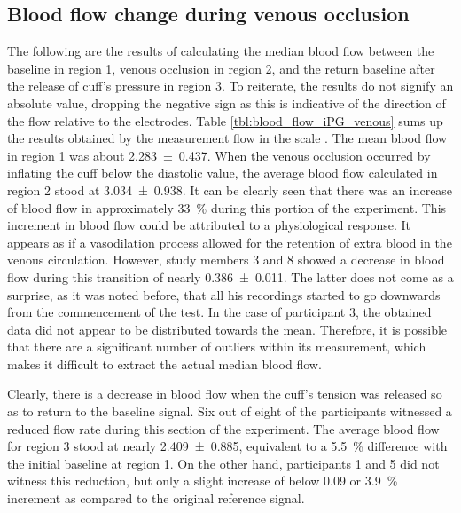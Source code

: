 \subsection{Blood flow change during venous occlusion}
\label{sectio results 3.1}
The following are the results of calculating the median blood flow between the baseline in region 1, venous occlusion in region 2, and the return baseline after the release of cuff's pressure in region 3. To reiterate, the results do not signify an absolute value, dropping the negative sign as this is indicative of the direction of the flow relative to the electrodes. Table \ref{tbl:blood_flow_iPG_venous} sums up the results obtained by the measurement flow in the scale \si{\bfv}. The mean blood flow in region 1 was about \SI{2.283(0437)}{\bfv}. When the venous occlusion occurred by inflating the cuff below the diastolic value, the average blood flow calculated in region 2 stood at \SI{3.034(0938)}{\bfv}. It can be clearly seen that there was an increase of blood flow in approximately \SI{33}{\percent} during this portion of the experiment. This increment in blood flow could be attributed to a physiological response. It appears as if a vasodilation process allowed for the retention of extra blood in the venous circulation. However, study members 3 and 8 showed a decrease in blood flow during this transition of nearly \SI{0.386(0011)}{\bfv}. The latter does not come as a surprise, as it was noted before, that all his recordings started to go downwards from the commencement of the test. In the case of participant 3, the obtained data did not appear to be distributed towards the mean. Therefore, it is possible that there are a significant number of outliers within its measurement, which makes it difficult to extract the actual median blood flow. 

Clearly, there is a decrease in blood flow when the cuff's tension was released so as to return to the baseline signal.  Six out of eight of the participants witnessed a reduced flow rate during this section of the experiment. The average blood flow for region 3 stood at nearly \SI{2.409(0885)}{\bfv}, equivalent to a \SI{5.5}{\percent} difference with the initial baseline at region 1. On the other hand, participants 1 and 5 did not witness this reduction, but only a slight increase of below \SI{0.09}{\bfv} or \SI{3.9}{\percent} increment as compared to the original reference signal.

